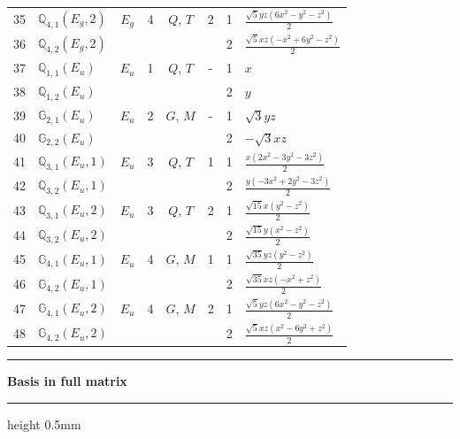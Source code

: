 \documentclass[fleqn,10pt,landscape]{jsarticle}
\begin{document}
\begin{longtable}[l]{clcccccl}
35 & $\mathbb{Q}_{4,1}(E_{g},2)$ & $E_{g}$ & 4 & $Q$, $T$ & 2 & 1 & $\frac{\sqrt{5} y z \left(6 x^{2} - y^{2} - z^{2}\right)}{2}$ \\
36 & $\mathbb{Q}_{4,2}(E_{g},2)$ &  &  &  &  & 2 & $\frac{\sqrt{5} x z \left(- x^{2} + 6 y^{2} - z^{2}\right)}{2}$ \\ \hline
37 & $\mathbb{Q}_{1,1}(E_{u})$ & $E_{u}$ & 1 & $Q$, $T$ & - & 1 & $x$ \\
38 & $\mathbb{Q}_{1,2}(E_{u})$ &  &  &  &  & 2 & $y$ \\ \hline
39 & $\mathbb{G}_{2,1}(E_{u})$ & $E_{u}$ & 2 & $G$, $M$ & - & 1 & $\sqrt{3} y z$ \\
40 & $\mathbb{G}_{2,2}(E_{u})$ &  &  &  &  & 2 & $- \sqrt{3} x z$ \\ \hline
41 & $\mathbb{Q}_{3,1}(E_{u},1)$ & $E_{u}$ & 3 & $Q$, $T$ & 1 & 1 & $\frac{x \left(2 x^{2} - 3 y^{2} - 3 z^{2}\right)}{2}$ \\
42 & $\mathbb{Q}_{3,2}(E_{u},1)$ &  &  &  &  & 2 & $\frac{y \left(- 3 x^{2} + 2 y^{2} - 3 z^{2}\right)}{2}$ \\ \hline
43 & $\mathbb{Q}_{3,1}(E_{u},2)$ & $E_{u}$ & 3 & $Q$, $T$ & 2 & 1 & $\frac{\sqrt{15} x \left(y^{2} - z^{2}\right)}{2}$ \\
44 & $\mathbb{Q}_{3,2}(E_{u},2)$ &  &  &  &  & 2 & $\frac{\sqrt{15} y \left(x^{2} - z^{2}\right)}{2}$ \\ \hline
45 & $\mathbb{G}_{4,1}(E_{u},1)$ & $E_{u}$ & 4 & $G$, $M$ & 1 & 1 & $\frac{\sqrt{35} y z \left(y^{2} - z^{2}\right)}{2}$ \\
46 & $\mathbb{G}_{4,2}(E_{u},1)$ &  &  &  &  & 2 & $\frac{\sqrt{35} x z \left(- x^{2} + z^{2}\right)}{2}$ \\ \hline
47 & $\mathbb{G}_{4,1}(E_{u},2)$ & $E_{u}$ & 4 & $G$, $M$ & 2 & 1 & $\frac{\sqrt{5} y z \left(6 x^{2} - y^{2} - z^{2}\right)}{2}$ \\
48 & $\mathbb{G}_{4,2}(E_{u},2)$ &  &  &  &  & 2 & $\frac{\sqrt{5} x z \left(x^{2} - 6 y^{2} + z^{2}\right)}{2}$ \\
\end{longtable}
\vspace{5mm}
\noindent \rule[0.5mm]{5mm}{0.5mm}\hspace{3mm}\textbf{Basis in full matrix}\hspace{3mm}\leaders\hrule height 0.5mm\hfill\kern0pt
\vspace{3mm}
\end{document}
